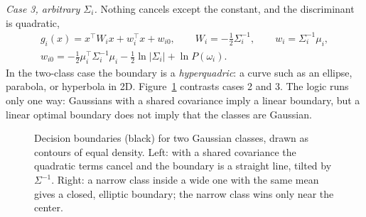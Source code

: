 \emph{Case 3, arbitrary $\Sigma_i$.} Nothing cancels except the constant, and
the discriminant is quadratic,
\begin{gather}
  g_i(x) = x^\top W_i x + w_i^\top x + w_{i0},
  \qquad
  W_i = -\tfrac12\Sigma_i^{-1},
  \qquad
  w_i = \Sigma_i^{-1}\mu_i, \nonumber\\
  w_{i0} = -\tfrac12\mu_i^\top\Sigma_i^{-1}\mu_i
  - \tfrac12\ln\lvert\Sigma_i\rvert + \ln P(\omega_i).
\end{gather}
\noindent
In the two-class case the boundary is a \emph{hyperquadric}: a curve such as an
ellipse, parabola, or hyperbola in 2D. Figure~\ref{fig:discr-cases} contrasts
cases 2 and 3. The logic runs only one way: Gaussians with a shared covariance
imply a linear boundary, but a linear optimal boundary does not imply that the
classes are Gaussian.

\begin{figure}[ht]
  \centering
  \caption{Decision boundaries (black) for two Gaussian classes, drawn as
  contours of equal density. Left: with a shared covariance the quadratic terms
  cancel and the boundary is a straight line, tilted by $\Sigma^{-1}$. Right: a
  narrow class inside a wide one with the same mean gives a closed, elliptic
  boundary; the narrow class wins only near the center.}
  \label{fig:discr-cases}
\end{figure}

